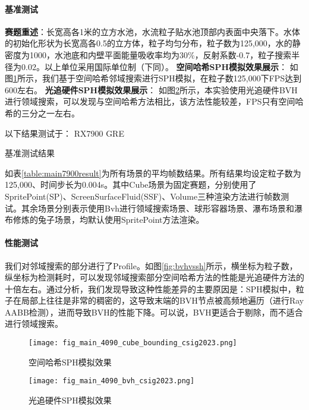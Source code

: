 \paragraph{基准测试}
\textbf{赛题重述}：长宽高各1米的立方水池，水流粒子贴水池顶部内表面中央落下。水体的初始化形状为长宽高各0.5的立方体，粒子均匀分布，粒子数为125,000，水的静密度为1000，水池底和内壁平面能量吸收率均为30\%，反射系数-0.7，粒子搜索半径为0.02。以上单位采用国际单位制（下同）。
\textbf{空间哈希SPH模拟效果展示}：
如图\ref{fig:main4090cubebounding}所示，我们基于空间哈希邻域搜索进行SPH模拟，在粒子数125,000下FPS达到600左右。
\textbf{光追硬件SPH模拟效果展示}：
如图\ref{fig:bvh}所示，本实验使用光追硬件BVH进行领域搜索，可以发现与空间哈希方法相比，该方法性能较差，FPS只有空间哈希的三分之一左右。

以下结果测试于： RX7900 GRE
\begin{table}[h!]
    \begin{center}
        
    \end{center}
    \caption{基准测试结果}
    \label{table:main7900result}
\end{table}

如表\ref{table:main7900result}为所有场景的平均帧数结果。所有结果均设定粒子数为125,000、时间步长为0.004s。其中Cube场景为固定赛题，分别使用了SpritePoint(SP)、ScreenSurfaceFluid(SSF)、Volume三种渲染方法进行帧数测试。其余场景分别表示使用Bvh进行领域搜索场景、球形容器场景、瀑布场景和瀑布修炼的兔子场景，均默认使用SpritePoint方法渲染。

\paragraph{性能测试}

我们对邻域搜索的部分进行了Profile。如图\ref{fig:bvhvssh}所示，横坐标为粒子数，纵坐标为检测耗时，可以发现邻域搜索部分空间哈希方法的性能是光追硬件方法的十倍左右。通过分析，我们发现导致这种性能差异的主要原因是：SPH模拟中，粒子在局部上往往是非常的稠密的，这导致末端的BVH节点被高频地遍历（进行Ray AABB检测），进而导致BVH的性能下降。可以说，BVH更适合于剔除，而不适合进行领域搜索。
\begin{figure}[H]
	\centering
	\texttt{[image: fig\_main\_4090\_cube\_bounding\_csig2023.png]}
	\caption{空间哈希SPH模拟效果}
	\label{fig:main4090cubebounding}
\end{figure}

\begin{figure}[H]
	\centering
	\texttt{[image: fig\_main\_4090\_bvh\_csig2023.png]}
	\caption{光追硬件SPH模拟效果}
	\label{fig:bvh}
\end{figure}

